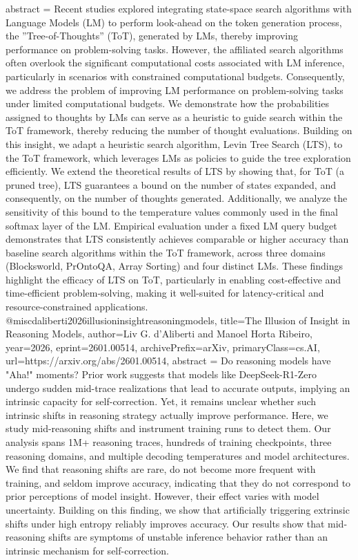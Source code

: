 {      abstract = {Recent studies explored integrating state-space search algorithms with Language Models (LM) to perform look-ahead on the token generation process, the ''Tree-of-Thoughts'' (ToT), generated by LMs, thereby improving performance on problem-solving tasks. However, the affiliated search algorithms often overlook the significant computational costs associated with LM inference, particularly in scenarios with constrained computational budgets. Consequently, we address the problem of improving LM performance on problem-solving tasks under limited computational budgets. We demonstrate how the probabilities assigned to thoughts by LMs can serve as a heuristic to guide search within the ToT framework, thereby reducing the number of thought evaluations. Building on this insight, we adapt a heuristic search algorithm, Levin Tree Search (LTS), to the ToT framework, which leverages LMs as policies to guide the tree exploration efficiently. We extend the theoretical results of LTS by showing that, for ToT (a pruned tree), LTS guarantees a bound on the number of states expanded, and consequently, on the number of thoughts generated. Additionally, we analyze the sensitivity of this bound to the temperature values commonly used in the final softmax layer of the LM. Empirical evaluation under a fixed LM query budget demonstrates that LTS consistently achieves comparable or higher accuracy than baseline search algorithms within the ToT framework, across three domains (Blocksworld, PrOntoQA, Array Sorting) and four distinct LMs. These findings highlight the efficacy of LTS on ToT, particularly in enabling cost-effective and time-efficient problem-solving, making it well-suited for latency-critical and resource-constrained applications.}
}@misc{daliberti2026illusioninsightreasoningmodels,
      title={The Illusion of Insight in Reasoning Models}, 
      author={Liv G. d'Aliberti and Manoel Horta Ribeiro},
      year={2026},
      eprint={2601.00514},
      archivePrefix={arXiv},
      primaryClass={cs.AI},
      url={https://arxiv.org/abs/2601.00514},
      abstract = {Do reasoning models have "Aha!" moments? Prior work suggests that models like DeepSeek-R1-Zero undergo sudden mid-trace realizations that lead to accurate outputs, implying an intrinsic capacity for self-correction. Yet, it remains unclear whether such intrinsic shifts in reasoning strategy actually improve performance. Here, we study mid-reasoning shifts and instrument training runs to detect them. Our analysis spans 1M+ reasoning traces, hundreds of training checkpoints, three reasoning domains, and multiple decoding temperatures and model architectures. We find that reasoning shifts are rare, do not become more frequent with training, and seldom improve accuracy, indicating that they do not correspond to prior perceptions of model insight. However, their effect varies with model uncertainty. Building on this finding, we show that artificially triggering extrinsic shifts under high entropy reliably improves accuracy. Our results show that mid-reasoning shifts are symptoms of unstable inference behavior rather than an intrinsic mechanism for self-correction.}
}
